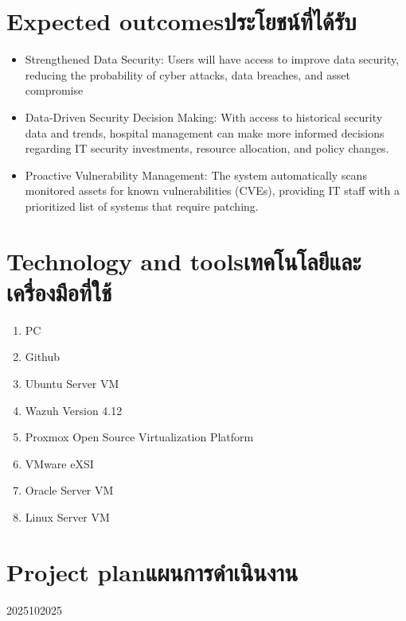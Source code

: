 \section{\ifenglish Expected outcomes\else ประโยชน์ที่ได้รับ\fi}
\begin{itemize}
    \item{Strengthened Data Security: Users will have access to improve data security, reducing the probability of cyber attacks, data breaches, and asset compromise}
    \item{Data-Driven Security Decision Making: With access to historical security data and trends, hospital management can make more informed decisions regarding IT security investments, resource allocation, and policy changes.}
    \item{Proactive Vulnerability Management: The system automatically scans monitored assets for known vulnerabilities (CVEs), providing IT staff with a prioritized list of systems that require patching.}
\end{itemize}

\section{\ifenglish Technology and tools\else เทคโนโลยีและเครื่องมือที่ใช้\fi}
\begin{enumerate}
    \item{PC}
    \item{Github}
    \item{Ubuntu Server VM}
    \item{Wazuh Version 4.12}
    \item{Proxmox Open Source Virtualization Platform}
    \item{VMware eXSI}
    \item{Oracle Server VM}
    \item{Linux Server VM}
\end{enumerate}

\section{\ifenglish Project plan\else แผนการดำเนินงาน\fi}

\begin{plan}{6}{2025}{10}{2025}
\end{plan}

